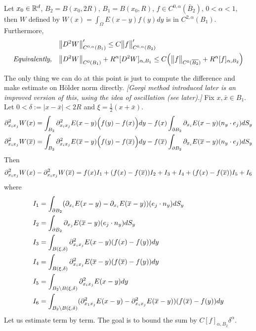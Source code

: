 \documentclass[12pt,a4paper]{article}
\newenvironment{proof}
{\begin{changemargin}{1cm}{0.5cm} 
	}%
	{\end{changemargin}
}
\newenvironment{p}
{\begin{proof} 
	}%
	{\end{proof}
}
\begin{document}
 Let $x_0\in \mathbb{R}^d$, $B_2 = B(x_0, 2R)$, $B_1=B(x_0, R)$, $f\in C^{0, \alpha}(\bar{B}_2)$, $0<\alpha<1$, then $W$ defined by $W(x) = \int_{\Omega} E(x-y) f(y)dy$ is in $C^{2,\alpha}(B_1)$. Furthermore,
\begin{align*}
&\bigl\lVert D^2 W\bigr\rVert_{C^{0, \alpha}(B_1)}' \leq C \bigl\lVert f\bigr\rVert_{C^{0, \alpha}(B_2)}' \\
\textit{Equivalently,} \quad &\bigl\lVert D^2 W\bigr\rVert_{C^0(B_1)} +R^{\alpha}[D^2 W]_{\alpha, B_1} \leq C \Big( \bigl\lVert f\bigr\rVert_{C^0(\overline{B_2})} + R^{\alpha}[f]_{\alpha, B_2} \Big)
\end{align*}
\begin{p}
\pf The only thing we can do at this point is just to compute the difference and make estimate on H\"older norm directly. \emph{[Gorgi method introduced later is an improved version of this, using the idea of oscillation (see later).]}
Fix $x, \bar{x} \in B_1$. Let $0<\delta := |x-\bar{x}|< 2R$ and $\xi = \frac{1}{2}(x+\bar{x})$.
\begin{align*}
&\partial^2_{x_i x_j} W(x) = \int_{B_2} \partial_{x_i x_j}^2 E(x-y) \Big(f(y)- f(x)\Big) dy - f(x) \int_{\partial B_2} \partial_{x_i} E(x-y) (n_y \cdot e_j) dS_y \\
&\partial_{x_i x_j}^2 W(\overline{x}) = \int_{B_2} \partial_{x_i x_j}^2 E(\overline{x}-y) \Big(f(y)- f(\overline{x})\Big) dy - f(\overline{x}) \int_{\partial B_2} \partial_{x_i} E(\overline{x}-y) (n_y \cdot e_j) dS_y
\end{align*}
Then
\begin{align*}
\partial_{x_i x_j}^2 W(x) - \partial_{x_i x_j}^2 W(\overline{x}) = f(x)I_1 + (f(x)- f(\overline{x}))I_2 + I_3 + I_4 + (f(x)-f(\overline{x}))I_5 + I_6 
\end{align*}
where
\begin{align*}
&I_1 = \int_{\partial B_2} (\partial_{x_i} E(x-y) - \partial_{x_i}E(\overline{x}-y))(e_j \cdot n_y) dS_y \\
&I_2 = \int_{\partial B_2} \partial_{x_j} E(\overline{x} -y) (e_j \cdot n_y) dS_y \\
&I_3 = \int_{B(\xi, \delta)} \partial^2_{x_i x_j} E(x-y) (f(x)-f(y)) dy \\
&I_4 = \int_{B(\xi, \delta)} \partial_{x_i x_j}^2 E(\overline{x}-y) (f(\overline{x}) - f(y))dy \\
&I_5 = \int_{B_2 \backslash B(\xi, \delta)} \partial_{x_i x_j}^2 E(x-y) dy \\
&I_6 = \int_{B_2 \backslash B(\xi, \delta)} (\partial_{x_1 x_j}^2 E(x-y) - \partial^2_{x_i x_j}E(\overline{x}-y) ) (f(\overline{x}) - f(y))dy
\end{align*}
Let us estimate term by term. The goal is to bound the sum by $C [f]_{\alpha, B_2}\delta^{\alpha}$.

\end{p}
\end{document}
